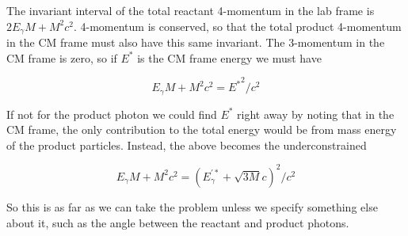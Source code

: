\documentclass[12pt]{article}
\begin{document}
The invariant interval of the total reactant 4-momentum in the lab frame is \(2E_\gamma M + M^2 c^2\). 4-momentum is conserved, so that the total product 4-momentum in the CM frame must also have this same invariant. The 3-momentum in the CM frame is zero, so if \(E^*\) is the CM frame energy we must have

\[E_\gamma M + M^2 c^2 = {E^*}^2/c^2
\] 

If not for the product photon we could find \(E^*\) right away by noting that in the CM frame, the only contribution to the total energy would be from mass energy of the product particles. Instead, the above becomes the underconstrained

\[E_\gamma M + M^2 c^2 = {(E_\gamma^{'*} + \sqrt{3M}c)}^2/c^2
\] 

So this is as far as we can take the problem unless we specify something else about it, such as the angle between the reactant and product photons.




%
%
%
\end{document}
